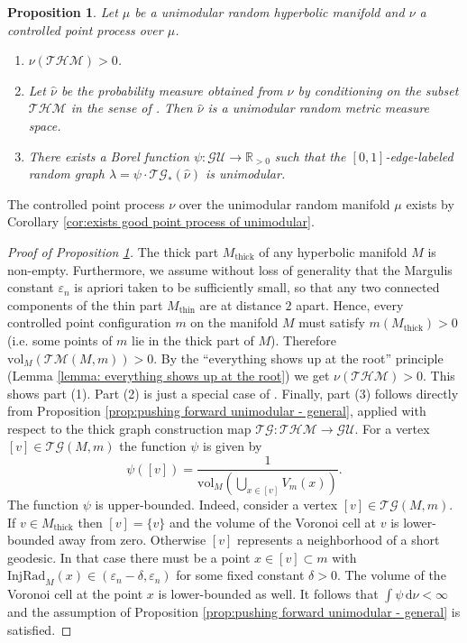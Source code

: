\documentclass{amsart}
\newcommand{\RR}{\mathbb{R}}
\newcommand{\GraphsU}{\mathcal{GU}}
\newcommand{\ThickGraph}{\mathcal{TG}}
\newcommand{\ThickHypersP}{\mathcal{THM}}
\newcommand{\ThickManifold}[2]{\mathcal{TM}(#1,#2)}
\newcommand{\vol}{\mathrm{vol}}
\theoremstyle{plain}
\newtheorem{prop}[theorem]{Proposition}
\numberwithin{equation}{section}
\theoremstyle{definition}
\begin{document}
\begin{prop}
\label{prop:modified point process}
Let $\mu$ be a unimodular random hyperbolic manifold and 
$\nu$  a controlled point process over $\mu$.
\begin{enumerate}
    \item $\nu(\ThickHypersP)>0$.
    \item Let $\widehat{\nu}$ be the probability measure obtained from $\nu$ by conditioning on  the subset $\ThickHypersP$ in the sense of  . Then $\widehat{\nu}$ is a unimodular random metric measure space.
    \item There exists a Borel function $\psi : \GraphsU \to \RR_{>0}$ such that the $\left[0,1\right]$-edge-labeled random graph
    $\lambda = \psi \cdot \ThickGraph_* (\widehat{\nu})$ is unimodular.
\end{enumerate}
\end{prop}
The controlled point process $\nu$ over the unimodular random manifold $\mu$ exists  by  Corollary \ref{cor:exists good point process of unimodular}. 
\begin{proof}[Proof of Proposition \ref{prop:modified point process}]
The thick part $M_\text{thick}$ of any hyperbolic manifold $M$ is non-empty. Furthermore, we assume without loss of generality that the Margulis constant $\varepsilon_n$ is apriori taken to be sufficiently small, so that any two connected components of the thin part $M_\text{thin}$ are at distance $2$ apart. 
Hence, every controlled point configuration $m$ on the manifold $M$ must satisfy $m(M_\text{thick})>0$ (i.e. some points of $m$ lie in the thick part of $M$). Therefore $\vol_M(\ThickManifold{M}{m}) > 0$. By the \enquote{everything shows up at the root} principle (Lemma \ref{lemma: everything shows up at the root}) we get $\nu(\ThickHypersP)>0$. This shows part (1). Part (2) is just a special case of . Finally, part (3) follows directly from Proposition \ref{prop:pushing forward unimodular - general}, applied with respect to the thick graph construction map $ \ThickGraph : \ThickHypersP \to \GraphsU$. For a vertex $\left[v\right] \in \ThickGraph(M,m)$ the function $\psi$ is given by $$\psi(\left[v\right]) = \frac{1}{\vol_M\left(\bigcup_{x \in \left[v\right]} V_m(x)\right)}.$$
The function $\psi$ is upper-bounded. Indeed, consider a vertex $\left[v\right] \in \ThickGraph(M,m)$. If $v \in M_\mathrm{thick}$ then $\left[v\right] = \{v\}$ and the volume of the Voronoi cell at $v$ is lower-bounded away from zero. Otherwise  $\left[v\right]$ represents a neighborhood of a short geodesic. In that case there must be a point $x \in \left[v\right] \subset m$ with $\mathrm{InjRad}_M(x) \in (\varepsilon_n-\delta, \varepsilon_n)$ for some fixed constant $\delta > 0$. The volume of the Voronoi cell at the point $x$ is lower-bounded as well. It follows that $\int \psi \,\mathrm{d}\nu < \infty$ and the assumption of Proposition \ref{prop:pushing forward unimodular - general} is satisfied.
\end{proof}
\end{document}
